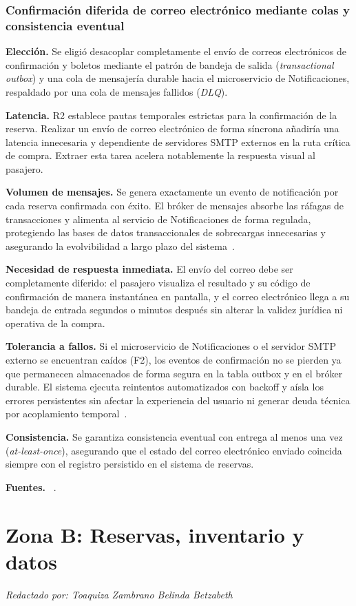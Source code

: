 \documentclass[11pt,a4paper]{article}
\newcommand{\autor}[1]{\par{\small\textit{Redactado por: #1}}\par}
\newcommand{\decision}[8]{\subsubsection*{#1}%
  \textbf{Elección.} #2\par
  \textbf{Latencia.} #3\par
  \textbf{Volumen de mensajes.} #4\par
  \textbf{Necesidad de respuesta inmediata.} #5\par
  \textbf{Tolerancia a fallos.} #6\par
  \textbf{Consistencia.} #7\par
  \textbf{Fuentes.} #8\par}
\newcommand{\integranteB}{Toaquiza Zambrano Belinda Betzabeth}
\begin{document}
\decision{Confirmación diferida de correo electrónico mediante colas y consistencia eventual}
 {Se eligió desacoplar completamente el envío de correos electrónicos de confirmación y boletos mediante el patrón de bandeja de salida (\textit{transactional outbox}) y una cola de mensajería durable hacia el microservicio de Notificaciones, respaldado por una cola de mensajes fallidos (\textit{DLQ}).}
 {R2 establece pautas temporales estrictas para la confirmación de la reserva. Realizar un envío de correo electrónico de forma síncrona añadiría una latencia innecesaria y dependiente de servidores SMTP externos en la ruta crítica de compra. Extraer esta tarea acelera notablemente la respuesta visual al pasajero.}
 {Se genera exactamente un evento de notificación por cada reserva confirmada con éxito. El bróker de mensajes absorbe las ráfagas de transacciones y alimenta al servicio de Notificaciones de forma regulada, protegiendo las bases de datos transaccionales de sobrecargas innecesarias y asegurando la evolvibilidad a largo plazo del sistema~\cite{Bogner2021}.}
 {El envío del correo debe ser completamente diferido: el pasajero visualiza el resultado y su código de confirmación de manera instantánea en pantalla, y el correo electrónico llega a su bandeja de entrada segundos o minutos después sin alterar la validez jurídica ni operativa de la compra.}
 {Si el microservicio de Notificaciones o el servidor SMTP externo se encuentran caídos (F2), los eventos de confirmación no se pierden ya que permanecen almacenados de forma segura en la tabla outbox y en el bróker durable. El sistema ejecuta reintentos automatizados con backoff y aísla los errores persistentes sin afectar la experiencia del usuario ni generar deuda técnica por acoplamiento temporal~\cite{DETOLEDO2021110968}.}
 {Se garantiza consistencia eventual con entrega al menos una vez (\textit{at-least-once}), asegurando que el estado del correo electrónico enviado coincida siempre con el registro persistido en el sistema de reservas.}
 {~\cite{CERNY2023111829, Bogner2021, DETOLEDO2021110968}.}

\section{Zona B: Reservas, inventario y datos}\label{sec:zonaB}
\autor{\integranteB}
\end{document}
